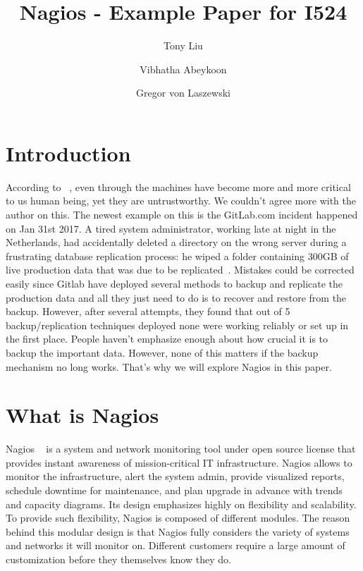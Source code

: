 \documentclass[9pt,twocolumn,twoside]{styles/osajnl}
\title{Nagios - Example Paper for I524}
\author[1]{Tony Liu}
\author[1]{Vibhatha Abeykoon}
\author[1]{Gregor von Laszewski}
\affil[1]{School of Informatics and Computing, Bloomington, IN 47408, U.S.A.}
\begin{document}
\maketitle

\section{Introduction}

According to ~\cite{nagios-book}, even through the machines have become more and 
more critical to us human being, yet they are untrustworthy. We couldn't agree more with the author on this. The newest example on this is the GitLab.com incident happened on Jan 31st 2017. A tired system administrator, working late at night in the Netherlands, had accidentally deleted a directory on the wrong server during a frustrating database replication process: he wiped a folder containing 300GB of live production data that was due to be replicated~\cite{gitlabmeltdown}. Mistakes could be corrected easily since Gitlab have deployed several methods to backup and replicate the production data and all they just need to do is to recover and restore from the backup. However, after several attempts, they found that out of 5 backup/replication techniques deployed none were working reliably or set up in the first place. People haven't emphasize enough about how crucial it is to backup the important data. However, none of this matters if the backup mechanism no long works. That's why we will explore Nagios in this paper.


\section{What is Nagios}

Nagios ~\cite{www-nagios} is a system and network monitoring tool under open source license that provides instant awareness of mission-critical IT infrastructure. Nagios allows to monitor the infrastructure, alert the system admin, provide visualized reports, schedule downtime for maintenance, and plan upgrade in advance with trends and capacity diagrams. Its design emphasizes highly on flexibility and scalability. To provide such flexibility, Nagios is composed of different modules. The reason behind this modular design is that Nagios fully considers the variety of systems and networks it will monitor on. Different customers require a large amount of customization before they themselves know they do.
\end{document}
